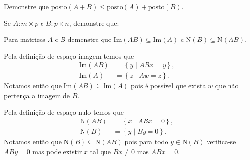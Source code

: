 \documentclass[a4paper,12pt, leqno, answers]{exam}
\newcommand{\EI}{\text{Im}}
\newcommand{\EN}{\text{N}}
\newcommand{\posto}{\text{posto}}
\begin{document}
\begin{questions}
    \question Demonstre que $\posto (A + B) \leq \posto (A) + \posto (B)$.
    \begin{solution}
        
    \end{solution}

    \question Se $A: m \times p$ e $B: p \times n$, demonstre que:

    \question Para matrizes $A$ e $B$ demonstre que $\EI (A B) \subseteq \EI (A)$ e $\EN (B) \subseteq \EN (A B)$.
    \begin{solution}
        Pela defini\c{c}\~{a}o de espa\c{c}o imagem temos que
        \begin{align*}
            \EI (A B) &= \left\{ y \mid A B x = y \right\}, \\
            \EI (A) &= \left\{ z \mid A w = z \right\}.
        \end{align*}
        Notamos ent\~{a}o que $\EI (A B) \subseteq \EI (A)$ pois \'{e} poss\'{i}vel que exista $w$ que n\~{a}o perten\c{c}a a imagem de $B$.

        Pela defini\c{c}\~{a}o de espa\c{c}o nulo temos que
        \begin{align*}
            \EN (A B) &= \left\{ x \mid A B x = 0 \right\}, \\
            \EN (B) &= \left\{ y \mid B y = 0 \right\}.
        \end{align*}
        Notamos ent\~{a}o que $\EN (B) \subseteq \EN (A B)$ pois para todo $y \in \EN (B)$ verifica-se $A B y = 0$ mas pode existir $x$ tal que $B x \neq 0$ mas $ A B x = 0$.
        

\end{solution}
\end{questions}
\end{document}
